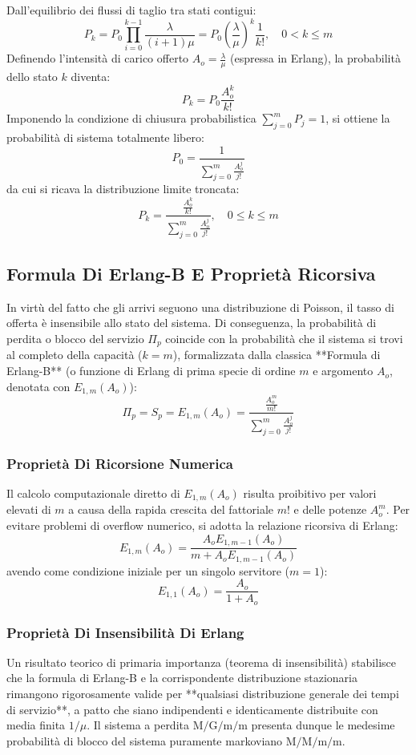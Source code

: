 \documentclass[11pt, a4paper]{article}
\begin{document}

Dall'equilibrio dei flussi di taglio tra stati contigui:
\[
P_k = P_0 \prod_{i=0}^{k-1} \frac{\lambda}{(i+1)\mu} = P_0 \left( \frac{\lambda}{\mu} \right)^k \frac{1}{k!}, \quad 0 < k \le m
\]
Definendo l'intensità di carico offerto $A_o = \frac{\lambda}{\mu}$ (espressa in Erlang), la probabilità dello stato $k$ diventa:
\[
P_k = P_0 \frac{A_o^k}{k!}
\]
Imponendo la condizione di chiusura probabilistica $\sum_{j=0}^m P_j = 1$, si ottiene la probabilità di sistema totalmente libero:
\[
P_0 = \frac{1}{\sum_{j=0}^{m} \frac{A_o^j}{j!}}
\]
da cui si ricava la distribuzione limite troncata:
\[
\boxed{P_k = \frac{\frac{A_o^k}{k!}}{\sum_{j=0}^{m} \frac{A_o^j}{j!}}, \quad 0 \le k \le m}
\]

\subsection{Formula Di Erlang-B E Proprietà Ricorsiva}

In virtù del fatto che gli arrivi seguono una distribuzione di Poisson, il tasso di offerta è insensibile allo stato del sistema. Di conseguenza, la probabilità di perdita o blocco del servizio $\Pi_p$ coincide con la probabilità che il sistema si trovi al completo della capacità ($k=m$), formalizzata dalla classica **Formula di Erlang-B** (o funzione di Erlang di prima specie di ordine $m$ e argomento $A_o$, denotata con $E_{1,m}(A_o)$):
\[
\boxed{\Pi_p = S_p = E_{1,m}(A_o) = \frac{\frac{A_o^m}{m!}}{\sum_{j=0}^m \frac{A_o^j}{j!}}}
\]

\subsubsection{Proprietà Di Ricorsione Numerica}
Il calcolo computazionale diretto di $E_{1,m}(A_o)$ risulta proibitivo per valori elevati di $m$ a causa della rapida crescita del fattoriale $m!$ e delle potenze $A_o^m$. Per evitare problemi di overflow numerico, si adotta la relazione ricorsiva di Erlang:
\[
\boxed{E_{1,m}(A_o) = \frac{A_o E_{1,m-1}(A_o)}{m + A_o E_{1,m-1}(A_o)}}
\]
avendo come condizione iniziale per un singolo servitore ($m=1$):
\[
\boxed{E_{1,1}(A_o) = \frac{A_o}{1 + A_o}}
\]

\subsubsection{Proprietà Di Insensibilità Di Erlang}
Un risultato teorico di primaria importanza (teorema di insensibilità) stabilisce che la formula di Erlang-B e la corrispondente distribuzione stazionaria rimangono rigorosamente valide per **qualsiasi distribuzione generale dei tempi di servizio**, a patto che siano indipendenti e identicamente distribuite con media finita $1/\mu$. Il sistema a perdita $\mathrm{M/G/m/m}$ presenta dunque le medesime probabilità di blocco del sistema puramente markoviano $\mathrm{M/M/m/m}$.
\end{document}
